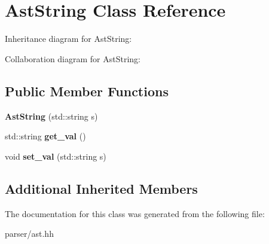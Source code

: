 \hypertarget{classAstString}{}\section{Ast\+String Class Reference}
\label{classAstString}


Inheritance diagram for Ast\+String\+:


Collaboration diagram for Ast\+String\+:
\subsection*{Public Member Functions}
\begin{DoxyCompactItemize}
\item 
\mbox{\label{classAstString_a11308cafe01e8bd33802606bdd8a82dd}} 
{\bfseries Ast\+String} (std\+::string s)
\item 
\mbox{\label{classAstString_af27f4ad147ee0c95f27be37b3404a5c6}} 
std\+::string {\bfseries get\+\_\+val} ()
\item 
\mbox{\label{classAstString_abb2aca4a5ecf446d7316c62a9ec4e90a}} 
void {\bfseries set\+\_\+val} (std\+::string s)
\end{DoxyCompactItemize}
\subsection*{Additional Inherited Members}


The documentation for this class was generated from the following file\+:\begin{DoxyCompactItemize}
\item 
parser/ast.\+hh\end{DoxyCompactItemize}
